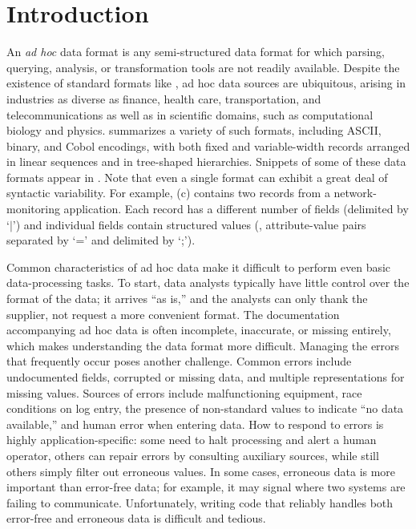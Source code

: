 \section{Introduction}
\label{sec:intro}

An {\em ad hoc} data format is any semi-structured data format for which
parsing, querying, analysis, or transformation tools are not readily
available.  Despite the existence of standard
formats like \xml{}, ad hoc data sources are ubiquitous,
arising in industries as diverse as finance, health care,
transportation, and telecommunications as well as in scientific
domains, such as computational biology and physics.
 summarizes a variety of such formats,
including ASCII, binary, and Cobol encodings, with both fixed and
variable-width records arranged in linear sequences and in tree-shaped
hierarchies.  Snippets of some of these data formats appear in .
Note that even a single format can exhibit a great deal of
syntactic variability.  For example, (c)
contains two records from a network-monitoring application.  
Each record has a different number of fields (delimited by `$|$') and
individual fields contain structured values (\eg{},
attribute-value pairs separated by `=' and delimited by `;').

Common characteristics of ad hoc data make it difficult to perform
even basic data-processing tasks.  To start, data analysts typically
have little control over the format of the data;  it
arrives ``as is,'' and the analysts can only thank the supplier,
not request a more convenient format.  The documentation accompanying
ad hoc data is often incomplete, inaccurate, or missing entirely,
which makes understanding the data format more difficult.
Managing the errors that frequently occur poses another challenge. Common errors include undocumented fields, corrupted or missing data, and multiple representations for missing values.  Sources of errors include
malfunctioning equipment, race conditions on log entry, the
presence of non-standard values to indicate ``no data available,'' and
human error when entering data.  How to respond to errors is highly 
application-specific: some need to halt processing and
alert a human operator, others can repair errors by consulting auxiliary sources, while still others simply filter out erroneous values. In some cases, erroneous data is more important than error-free data; for example, 
it may signal where two systems are failing to communicate.
Unfortunately, writing code that reliably handles
both error-free and erroneous data is difficult and tedious.

